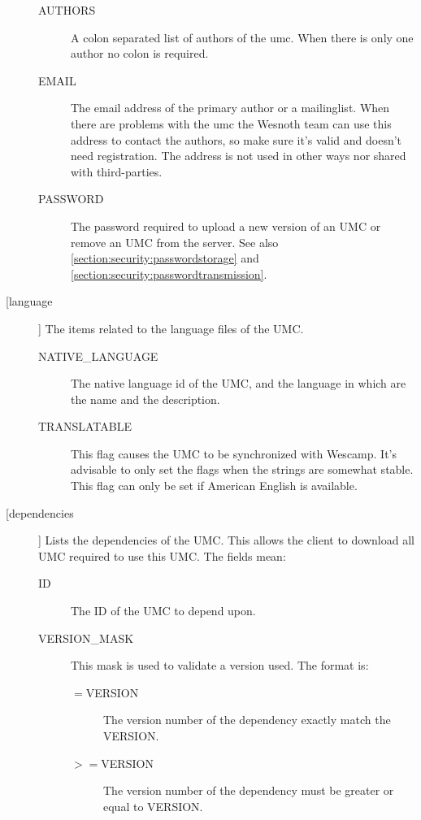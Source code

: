 \begin{description}
\begin{description}
\item[AUTHORS]
	A colon separated list of authors of the umc. When there is only one
	author no colon is required.

\item[EMAIL]
	The email address of the primary author or a mailinglist. When there are
	problems with the umc the Wesnoth team can use this address to contact
	the authors, so make sure it's valid and doesn't need registration.
	The address is not used in other ways nor shared with third-parties.

\item[PASSWORD]
	The password required to upload a new version of an UMC or remove an UMC
	from the server. See also \cref{section:security:passwordstorage} and \cref{section:security:passwordtransmission}.

\end{description}

\item [[language]] The items related to the language files of the UMC.

\begin{description}

\item[NATIVE\_LANGUAGE]
	The native language id of the UMC, and the language in which are the name and the description.

\item[TRANSLATABLE]
	This flag causes the UMC to be synchronized with Wescamp. It's advisable
	to only set the flags when the strings are somewhat stable. This flag
	can only be set if American English is available.
\end{description}


\item[[dependencies]]
Lists the dependencies of the UMC. This allows the client
to download all UMC required to use this UMC. The fields mean:
\begin{description}
\item[ID]
	The ID of the UMC to depend upon.

\item[VERSION\_MASK]
	This mask is used to validate a version used. The format is:
	\begin{description}
	\item[$=$VERSION]
		The version number of the dependency exactly match the VERSION.

	\item[$>=$VERSION]
		The version number of the dependency must be greater or equal to
		VERSION.


\end{description}
\end{description}
\end{description}
